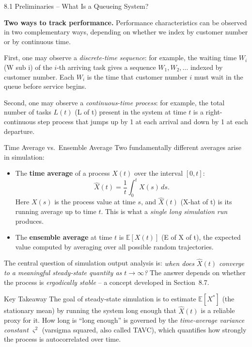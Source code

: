 \documentclass[aspectratio=169,10pt]{beamer}
\newcommand{\E}{\mathbb{E}}
\begin{document}
\begin{frame}[allowframebreaks]{8.1 Preliminaries -- What Is a Queueing System?}
\framebreak

\textbf{Two ways to track performance.}  Performance characteristics can be
observed in two complementary ways, depending on whether we index by customer
number or by continuous time.

First, one may observe a \emph{discrete-time sequence}: for example, the waiting
time $W_i$ (W sub i) of the $i$-th arriving task gives a sequence
$W_1, W_2, \ldots$ indexed by customer number.  Each $W_i$ is the time that
customer number $i$ must wait in the queue before service begins.

Second, one may observe a \emph{continuous-time process}: for example, the total
number of tasks $L(t)$ (L of t) present in the system at time $t$ is a
right-continuous step process that jumps up by 1 at each arrival and down by 1
at each departure.

\begin{block}{Time Average vs.\ Ensemble Average}
Two fundamentally different averages arise in simulation:
\begin{itemize}
  \item The \textbf{time average} of a process $X(t)$ over the interval $[0,t]$:
        \[
          \hat{X}(t) = \frac{1}{t}\int_0^t X(s)\,ds.
        \]
        Here $X(s)$ is the process value at time $s$, and $\hat{X}(t)$
        (X-hat of t) is its running average up to time $t$.  This is what a
        \emph{single long simulation run} produces.
  \item The \textbf{ensemble average} at time $t$ is $\E[X(t)]$ (E of X of t),
        the expected value computed by averaging over all possible random
        trajectories.
\end{itemize}
\end{block}

The central question of simulation output analysis is: \emph{when does
$\hat{X}(t)$ converge to a meaningful steady-state quantity as $t\to\infty$?}
The answer depends on whether the process is \emph{ergodically stable} -- a
concept developed in Section~8.7.

\begin{alertblock}{Key Takeaway}
The goal of steady-state simulation is to estimate $\E[X^*]$ (the stationary
mean) by running the system long enough that $\hat{X}(t)$ is a reliable proxy
for it.  How long is ``long enough'' is governed by the \emph{time-average
variance constant} $\varsigma^2$ (varsigma squared, also called TAVC), which
quantifies how strongly the process is autocorrelated over time.
\end{alertblock}

\end{frame}
\end{document}
